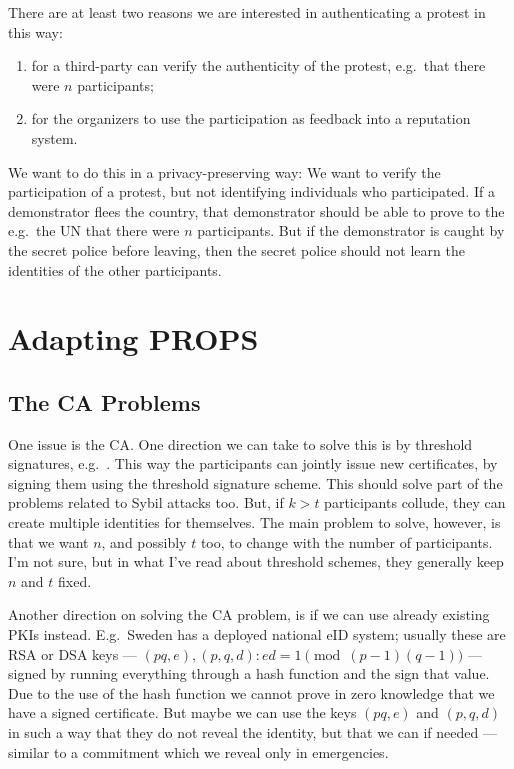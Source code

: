 There are at least two reasons we are interested in authenticating a protest in 
this way:
\begin{enumerate}
\item for a third-party can verify the authenticity of the protest, e.g.\ that 
  there were \(n\) participants;
\item for the organizers to use the participation as feedback into a reputation 
  system.
\end{enumerate}
We want to do this in a privacy-preserving way:
We want to verify the participation of a protest, but not identifying 
individuals who participated.
If a demonstrator flees the country, that demonstrator should be able to prove 
to the e.g.\ the UN that there were \(n\) participants.
But if the demonstrator is caught by the secret police before leaving, then the 
secret police should not learn the identities of the other participants.


\section{Adapting PROPS}

\subsection{The \acs*{CA} Problems}

One issue is the \ac{CA}.
One direction we can take to solve this is by threshold signatures, e.g.\ 
\cite{FSThresholdSignatures}.
This way the participants can jointly issue new certificates, by signing them 
using the threshold signature scheme.
This should solve part of the problems related to Sybil attacks too.
But, if \(k > t\) participants collude, they can create multiple identities for 
themselves.
The main problem to solve, however, is that we want \(n\), and possibly \(t\) 
too, to change with the number of participants.
I'm not sure, but in what I've read about threshold schemes, they generally 
keep \(n\) and \(t\) fixed.

Another direction on solving the \ac{CA} problem, is if we can use already 
existing \acp{PKI} instead.
E.g.\ Sweden has a deployed national \ac{eID} system; usually these are RSA or 
DSA keys --- \((pq, e), (p, q, d): ed = 1\pmod{(p-1)(q-1)}\) --- signed by 
running everything through a hash function and the sign that value.
Due to the use of the hash function we cannot prove in zero knowledge that we 
have a signed certificate.
But maybe we can use the keys \((pq, e)\) and \((p, q, d)\) in such a way that 
they do not reveal the identity, but that we can if needed --- similar to 
a commitment which we reveal only in emergencies.

